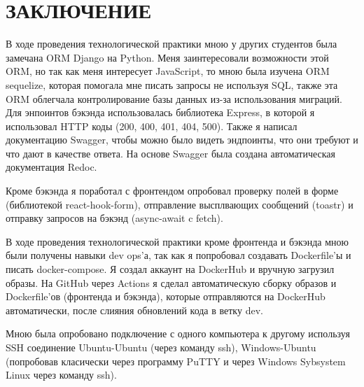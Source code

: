 \newpage
\section*{ЗАКЛЮЧЕНИЕ}
{}

В ходе проведения технологической практики мною у других студентов была замечана ORM Django на Python.
Меня заинтересовали возможности этой ORM, но так как меня интересует JavaScript,
то мною была изучена ORM sequelize,
которая помогала мне писать запросы не используя SQL,
также эта ORM облегчала контролирование базы данных из-за использования миграций.
Для энпоинтов бэкэнда использовалась библиотека Express, в которой я использовал HTTP коды (200, 400, 401, 404, 500).
Также я написал документацию Swagger, чтобы можно было видеть эндпоинты, что они требуют и что дают в качестве ответа.
На основе Swagger была создана автоматическая документация Redoc.

Кроме бэкэнда я поработал с фронтендом опробовал проверку полей в форме (библиотекой react-hook-form),
отправление высплвающих сообщений (toastr) и отправку запросов на бэкэнд (async-await c fetch).

В ходе проведения технологической практики кроме фронтенда и бэкэнда мною были получены навыки dev ops'а,
так как я попробовал создавать Dockerfile'ы и писать docker-compose.
Я создал аккаунт на DockerHub и вручную загрузил образы.
На GitHub через Actions я сделал автоматическую сборку образов и Dockerfile'ов (фронтенда и бэкэнда),
которые отправляются на DockerHub автоматически, после слияния обновлений кода в ветку dev.

Мною была опробовано подключение с одного компьютера к другому используя SSH соединение Ubuntu-Ubuntu (через команду ssh),
Windows-Ubuntu (попробовав класически через программу PuTTY и через Windows Sybsystem Linux через команду ssh).
